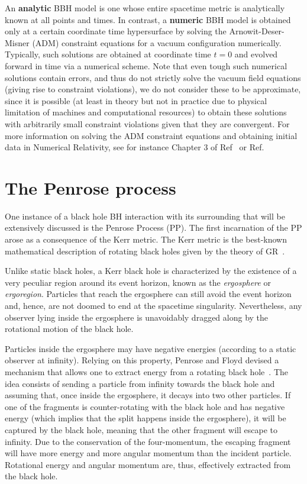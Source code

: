 \begin{definition}
  An \textbf{analytic} \ac{BBH} model is one whose entire spacetime metric is analytically known at all points and times. In contrast, a \textbf{numeric} \ac{BBH} model is obtained only at a certain coordinate time hypersurface by solving the Arnowit-Deser-Misner (\ac{ADM}) constraint equations for a vacuum configuration numerically. Typically, such solutions are obtained at coordinate time $t=0$ and evolved forward in time via a numerical scheme. Note that even tough such numerical solutions contain errors, and thus do not strictly solve the vacuum field equations (giving rise to constraint violations), we do not consider these to be approximate, since it is possible (at least in theory but not in practice due to physical limitation of machines and computational resources) to obtain these solutions with arbitrarily small constraint violations given that they are convergent. For more information on solving the \ac{ADM} constraint equations and obtaining initial data in Numerical Relativity, see for instance Chapter 3 of Ref~\cite{Alcubierre2012-xp} or Ref.~\cite{PhysRevD.70.064011}
\end{definition}

\section{The Penrose process}

One instance of a black hole \ac{BH} interaction with its surrounding that will be extensively discussed is the Penrose Process (\ac{PP}). The first incarnation of the \ac{PP} arose as a consequence of the Kerr metric. The Kerr metric is the best-known mathematical description of rotating black holes given by the theory of \ac{GR}~\cite{Visser:2007fj,Bambi:2011mj,Teukolsky:2014vca,berti}.

Unlike static black holes, a Kerr black hole is characterized by the existence of a very peculiar region around its event horizon, known as the \emph{ergosphere} or \emph{ergoregion}. Particles that reach the ergosphere can still avoid the event horizon and, hence, are not doomed to end at the spacetime singularity. Nevertheless, any observer lying inside the ergosphere is unavoidably dragged along by the rotational motion of the black hole.

Particles inside the ergosphere may have negative energies (according to a static observer at infinity). Relying on this property, Penrose and Floyd devised a mechanism that allows one to extract energy from a rotating black hole~\cite{PENROSE1971}. The idea consists of sending a particle from infinity towards the black hole and assuming that, once inside the ergosphere, it decays into two other particles. If one of the fragments is counter-rotating with the black hole and has negative energy (which implies that the split happens inside the ergosphere), it will be captured by the black hole, meaning that the other fragment will escape to infinity. Due to the conservation of the four-momentum, the escaping fragment will have more energy and more angular momentum than the incident particle. Rotational energy and angular momentum are, thus, effectively extracted from the black hole.

